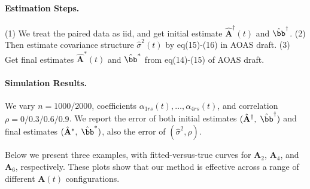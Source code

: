 \documentclass[10pt]{notes}
\begin{document}
\paragraph{Estimation Steps.} (1) We treat the paired data as iid, and get initial estimate $\hat{\mathbf{A}}^\dagger(t)$ and $\hat{\bb}^\dagger$. (2) Then estimate covariance structure $\hat{\sigma}^2(t)$ by eq(15)-(16) in AOAS draft.
(3) Get final estimates $\hat{\mathbf{A}}^*(t)$ and $\hat{\bb}^*$ from eq(14)-(15) of AOAS draft.

\paragraph{Simulation Results.} We vary $n=1000/2000$, coefficients $\alpha_{1rs}(t),\dots,\alpha_{4rs}(t)$, and correlation $\rho=0/0.3/0.6/0.9$. We report the error of both initial estimates $(\hat{\mathbf{A}}^\dagger,\;\hat{\bb}^\dagger)$ and final estimates $(\hat{\mathbf{A}}^*,\;\hat{\bb}^*)$, also the error of $(\hat{\sigma}^2, \hat{\rho})$.



\clearpage
\noindent
Below we present three examples, with fitted-versus-true curves for $\mathbf{A}_2$, $\mathbf{A}_4$, and $\mathbf{A}_6$, respectively. These plots show that our method is effective across a range of different $\mathbf{A}(t)$ configurations.
\end{document}
